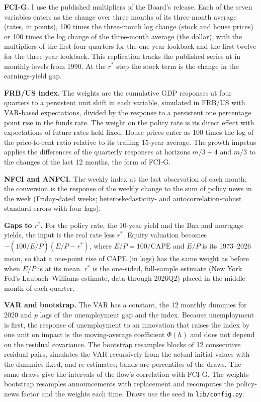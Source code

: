 \documentclass[11pt]{article}
\newcommand{\rs}{r^{*}}
\begin{document}
\begin{appendices}
\textbf{FCI-G.} I use the published multipliers of the Board's release. Each of the seven variables enters as the change over three months of its three-month average (rates, in points), 100 times the three-month log change (stock and house prices) or 100 times the log change of the three-month average (the dollar), with the multipliers of the first four quarters for the one-year lookback and the first twelve for the three-year lookback. This replication tracks the published series at  in monthly levels from 1990. At the $\rs$ step the stock term is the change in the earnings-yield gap.

\textbf{FRB/US index.} The weights are the cumulative GDP responses at four quarters to a persistent unit shift in each variable, simulated in FRB/US with VAR-based expectations, divided by the response to a persistent one percentage point rise in the funds rate. The weight on the policy rate is its direct effect with expectations of future rates held fixed. House prices enter as 100 times the log of the price-to-rent ratio relative to its trailing 15-year average. The growth impetus applies the differences of the quarterly responses at horizons $m/3+4$ and $m/3$ to the changes of the last 12 months, the form of FCI-G.

\textbf{NFCI and ANFCI.} The weekly index at the last observation of each month; the conversion is the response of the weekly change to the sum of policy news in the week (Friday-dated weeks; heteroskedasticity- and autocorrelation-robust standard errors with four lags).

\textbf{Gaps to $\rs$.} For the policy rate, the 10-year yield and the Baa and mortgage yields, the input is the real rate less $\rs$. Equity valuation becomes $-(100/\overline{E/P})(E/P-\rs)$, where $E/P=100/\text{CAPE}$ and $\overline{E/P}$ is its 1973--2026 mean, so that a one-point rise of CAPE (in logs) has the same weight as before when $E/P$ is at its mean. $\rs$ is the one-sided, full-sample estimate (New York Fed's Laubach--Williams estimate, data through 2026Q2) placed in the middle month of each quarter.

\textbf{VAR and bootstrap.} The VAR has a constant, the 12 monthly dummies for 2020 and $p$ lags of the unemployment gap and the index. Because unemployment is first, the response of unemployment to an innovation that raises the index by one unit on impact is the moving-average coefficient $\Phi(h)$ and does not depend on the residual covariance. The bootstrap resamples blocks of 12 consecutive residual pairs, simulates the VAR recursively from the actual initial values with the dummies fixed, and re-estimates; bands are percentiles of the  draws. The same draws give the intervals of the flow's correlation with FCI-G. The weights bootstrap resamples announcements with replacement and recomputes the policy-news factor and the weights each time. Draws use the seed in \texttt{lib/config.py}.


\end{appendices}
\end{document}
